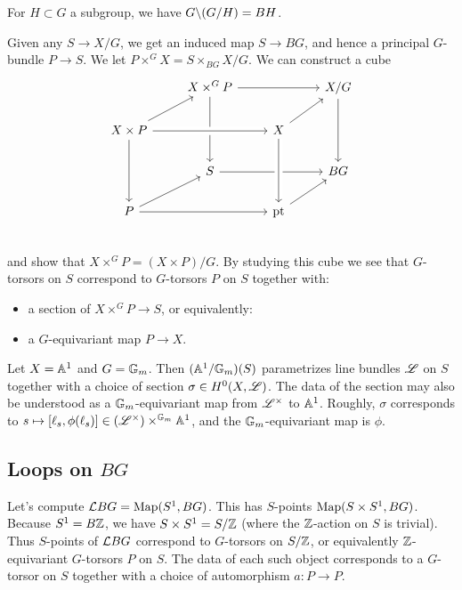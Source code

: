 \documentclass{article}
\begin{document}
\begin{ex}
  For $H \subset G$ a subgroup, we have $G \bs (G / H) = BH$.
\end{ex}

Given any $S \to X / G$, we get an induced map $S \to BG$, and hence a principal $G$-bundle $P \to S$.
We let $P \times^G X = S \times_{BG} X / G$.
We can construct a cube
\[ %
\begin{tikzcd}
& X \times^G P \arrow[rr] \arrow[dd] & & X / G \arrow[dd] \\
  X \times P \ar[ur] \arrow[rr, crossing over] \arrow[dd] & & X \ar[ur] \\
& S \arrow[rr] & & BG \\
  P \arrow[rr] \ar[ur] & & \pt \arrow[from=uu, crossing over] \ar[ur] \\
\end{tikzcd}
\]
and show that $X \times^G P = (X \times P) / G$.
By studying this cube we see that $G$-torsors on $S$ correspond to $G$-torsors $P$ on $S$ together with:
\begin{itemize}
  \item a section of $X \times^G P \to S$, or equivalently:
  \item a $G$-equivariant map $P \to X$.
\end{itemize}

\begin{ex}
  Let $X = \AA^1$ and $G = \GG_m$.
  Then $(\AA^1 / \GG_m)(S)$ parametrizes line bundles $\Lsc$ on $S$ together with a choice of section $\sigma \in H^0(X, \Lsc)$.
  The data of the section may also be understood as a $\GG_m$-equivariant map from $\Lsc^\times$ to $\AA^1$.
  Roughly, $\sigma$ corresponds to $s \mapsto [\ell_s, \phi(\ell_s)] \in (\Lsc^\times) \times^{\GG_m} \AA^1$, and the $\GG_m$-equivariant map is $\phi$.
\end{ex}

\subsection{Loops on $BG$}

Let's compute $\Lc BG = \Map(S^1, BG)$.
This has $S$-points $\Map(S \times S^1, BG)$.
Because $S^1 = B\ZZ$, we have $S \times S^1 = S / \ZZ$ (where the $\ZZ$-action on $S$ is trivial).
Thus $S$-points of $\Lc BG$ correspond to $G$-torsors on $S / \ZZ$, or equivalently $\ZZ$-equivariant $G$-torsors $P$ on $S$.
The data of each such object corresponds to a $G$-torsor on $S$ together with a choice of automorphism $a: P \to P$.
\end{document}
